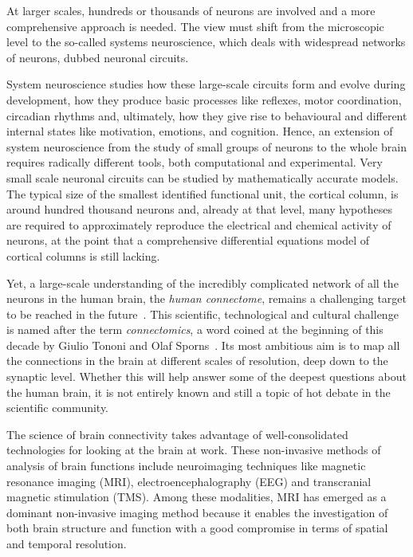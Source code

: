 At larger scales, hundreds or thousands of neurons are involved and a more comprehensive approach is needed.
The view must shift from the microscopic level to the so-called systems neuroscience, which deals with widespread networks of neurons, dubbed neuronal circuits.

System neuroscience studies how these large-scale circuits form and evolve during  development, how they produce basic processes like reflexes, motor coordination, circadian rhythms and, ultimately, how they give rise to behavioural and different internal states like motivation, emotions, and cognition.
Hence, an extension of system neuroscience from the study of small groups of neurons to the whole brain requires radically different tools, both computational and experimental.
Very small scale neuronal circuits can be studied by mathematically accurate models.
The typical size of the smallest identified functional unit, the cortical column, is around hundred thousand neurons and, already at that level, many hypotheses are required to approximately reproduce the electrical and chemical activity of neurons, at the point that a comprehensive differential equations model of cortical columns is still lacking.

Yet, a large-scale understanding of the incredibly complicated network of all the neurons in the human brain, the \emph{human connectome}, remains a challenging target to be reached in the future~\cite{amunts2016}.
This scientific, technological and cultural challenge is named after the term \emph{connectomics}, a word coined at the beginning of this decade by Giulio Tononi and Olaf Sporns~\cite{sporns2005}.
Its most ambitious aim is to map all the connections in the brain at different scales of resolution, deep down to the synaptic level.
Whether this will help answer some of the deepest questions about the human brain, it is not entirely known and still a topic of hot debate in the scientific community.

The science of brain connectivity takes advantage of well-consolidated technologies for looking at the brain at work.
These non-invasive methods of analysis of brain functions include neuroimaging techniques like magnetic resonance imaging (MRI), electroencephalography (EEG) and transcranial magnetic stimulation (TMS).
Among these modalities, MRI has emerged as a dominant non-invasive imaging method because it enables the investigation of both brain structure and function with a good compromise in terms of spatial and temporal resolution.

